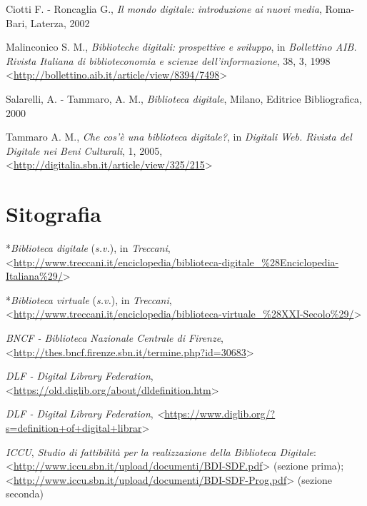 \documentclass[
  b5paper,
  twoside,
  11pt,
  chapterprefix=false,
  bibliography=totocnumbered,
  parskip=0]{scrbook}
\begin{document}
Ciotti F. - Roncaglia G., \emph{Il mondo digitale: introduzione ai nuovi
media}, Roma-Bari, Laterza, 2002

Malinconico S. M., \emph{Biblioteche digitali: prospettive e sviluppo}, in
\emph{Bollettino AIB. Rivista Italiana di biblioteconomia e scienze
dell'informazione}, 38, 3, 1998
\textless{}{\url{http://bollettino.aib.it/article/view/8394/7498}\textgreater{}}

Salarelli, A. - Tammaro, A. M., \emph{Biblioteca digitale}, Milano, Editrice
Bibliografica, 2000

Tammaro A. M., \emph{Che cos'è una biblioteca digitale?}, in \emph{Digitali Web.
Rivista del Digitale nei Beni Culturali}, 1, 2005,
\textless{}{\url{http://digitalia.sbn.it/article/view/325/215}\textgreater{}}

\hypertarget{sitografia-2}{%
\section*{Sitografia}\label{sitografia-2}}

*\emph{Biblioteca digitale} (\emph{s.v.}), in \emph{Treccani},
\textless{}{\href{http://www.treccani.it/enciclopedia/biblioteca-digitale_(Enciclopedia-Italiana)/}{http://www.treccani.it/enciclopedia/biblioteca-digitale\_\%28Enciclopedia-Italiana\%29/}\textgreater{}}

*\emph{Biblioteca virtuale} (\emph{s.v.}), in \emph{Treccani},
\textless{}{\href{http://www.treccani.it/enciclopedia/biblioteca-virtuale_(XXI-Secolo)/}{http://www.treccani.it/enciclopedia/biblioteca-virtuale\_\%28XXI-Secolo\%29/}\textgreater{}}

\emph{BNCF - Biblioteca Nazionale Centrale di Firenze},
\textless{}{\url{http://thes.bncf.firenze.sbn.it/termine.php?id=30683}\textgreater{}}

\emph{DLF - Digital Library Federation},
\textless{}{\url{https://old.diglib.org/about/dldefinition.htm}\textgreater{}}

\emph{DLF - Digital Library Federation},
\emph{\textless{}}{\url{https://www.diglib.org/?s=definition+of+digital+librar}\textgreater{}}

\emph{ICCU}, \emph{Studio di fattibilità per la realizzazione della Biblioteca
Digitale}:
\textless{}\href{http://www.iccu.sbn.it/upload/documenti/BDI-SDF.pdf}{{http://www.iccu.sbn.it/upload/documenti/BDI-SDF.pdf}}\textgreater{}
(sezione prima);
\textless{}{\url{http://www.iccu.sbn.it/upload/documenti/BDI-SDF-Prog.pdf}\textgreater{}}
(sezione seconda)
\end{document}
